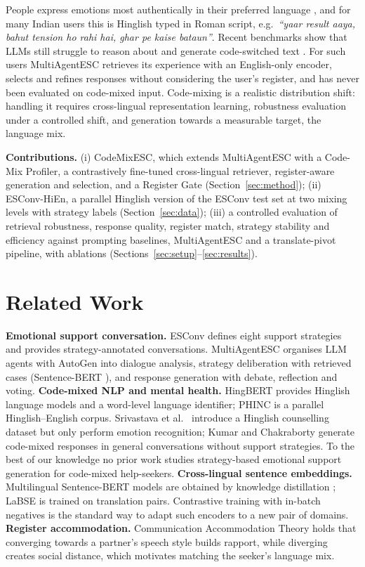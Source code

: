 \documentclass[conference]{IEEEtran}
\begin{document}
People express emotions most authentically in their preferred language \cite{srivastava2026knowledge},
and for many Indian users this is Hinglish typed in Roman script, e.g.\ \emph{``yaar result aaya,
bahut tension ho rahi hai, ghar pe kaise bataun''}. Recent benchmarks show that LLMs still
struggle to reason about and generate code-switched text \cite{winata2026codeswitch}. For such
users MultiAgentESC retrieves its experience with an English-only encoder, selects and refines
responses without considering the user's register, and has never been evaluated on code-mixed
input. Code-mixing is a realistic distribution shift: handling it requires cross-lingual
representation learning, robustness evaluation under a controlled shift, and generation towards a
measurable target, the language mix.

\noindent\textbf{Contributions.} (i) CodeMixESC, which extends MultiAgentESC with a Code-Mix
Profiler, a contrastively fine-tuned cross-lingual retriever, register-aware generation and
selection, and a Register Gate (Section~\ref{sec:method}); (ii) ESConv-HiEn, a parallel Hinglish
version of the ESConv test set at two mixing levels with strategy labels
(Section~\ref{sec:data}); (iii) a controlled evaluation of retrieval robustness, response quality,
register match, strategy stability and efficiency against prompting baselines, MultiAgentESC and a
translate-pivot pipeline, with ablations (Sections~\ref{sec:setup}--\ref{sec:results}).

\section{Related Work}
\textbf{Emotional support conversation.} ESConv \cite{liu2021towards} defines eight support
strategies and provides strategy-annotated conversations. MultiAgentESC
\cite{xu2025multiagentesc} organises LLM agents with AutoGen \cite{wu2024autogen} into dialogue
analysis, strategy deliberation with retrieved cases (Sentence-BERT \cite{reimers2019sbert}), and
response generation with debate, reflection and voting.
\textbf{Code-mixed NLP and mental health.} HingBERT \cite{nayak2022hingbert} provides Hinglish
language models and a word-level language identifier; PHINC \cite{srivastava2020phinc} is a
parallel Hinglish--English corpus. Srivastava et al.\ \cite{srivastava2026knowledge} introduce a
Hinglish counselling dataset but only perform emotion recognition; Kumar and Chakraborty
\cite{kumar2024harmonizing} generate code-mixed responses in general conversations without
support strategies. To the best of our knowledge no prior work studies strategy-based emotional
support generation for code-mixed help-seekers.
\textbf{Cross-lingual sentence embeddings.} Multilingual Sentence-BERT models are obtained by
knowledge distillation \cite{reimers2020multilingual}; LaBSE \cite{feng2022labse} is trained on
translation pairs. Contrastive training with in-batch negatives \cite{henderson2017smartreply} is
the standard way to adapt such encoders to a new pair of domains.
\textbf{Register accommodation.} Communication Accommodation Theory \cite{giles1991accommodation}
holds that converging towards a partner's speech style builds rapport, while diverging creates
social distance, which motivates matching the seeker's language mix.
\end{document}
